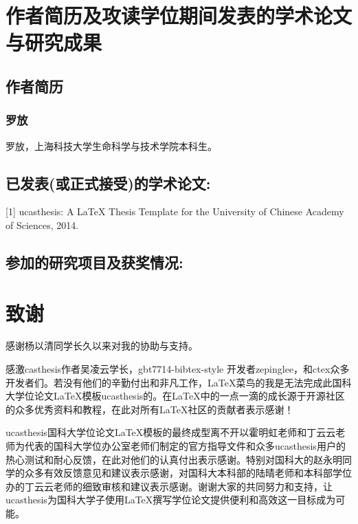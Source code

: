 \chapter{作者简历及攻读学位期间发表的学术论文与研究成果}

\section*{作者简历}

\subsection*{罗放}

罗放，上海科技大学生命科学与技术学院本科生。

\section*{已发表(或正式接受)的学术论文:}

[1] ucasthesis: A LaTeX Thesis Template for the University of Chinese Academy of Sciences, 2014.


\section*{参加的研究项目及获奖情况:}



\chapter[致谢]{致\quad 谢}%
\thispagestyle{noheaderstyle}%


感谢杨以清同学长久以来对我的协助与支持。

感激casthesis作者吴凌云学长，gbt7714-bibtex-style
开发者zepinglee，和ctex众多开发者们。若没有他们的辛勤付出和非凡工作，\LaTeX{}菜鸟的我是无法完成此国科大学位论文\LaTeX{}模板ucasthesis的。在\LaTeX{}中的一点一滴的成长源于开源社区的众多优秀资料和教程，在此对所有\LaTeX{}社区的贡献者表示感谢！

ucasthesis国科大学位论文\LaTeX{}模板的最终成型离不开以霍明虹老师和丁云云老师为代表的国科大学位办公室老师们制定的官方指导文件和众多ucasthesis用户的热心测试和耐心反馈，在此对他们的认真付出表示感谢。特别对国科大的赵永明同学的众多有效反馈意见和建议表示感谢，对国科大本科部的陆晴老师和本科部学位办的丁云云老师的细致审核和建议表示感谢。谢谢大家的共同努力和支持，让ucasthesis为国科大学子使用\LaTeX{}撰写学位论文提供便利和高效这一目标成为可能。

\cleardoublepage[plain]%


